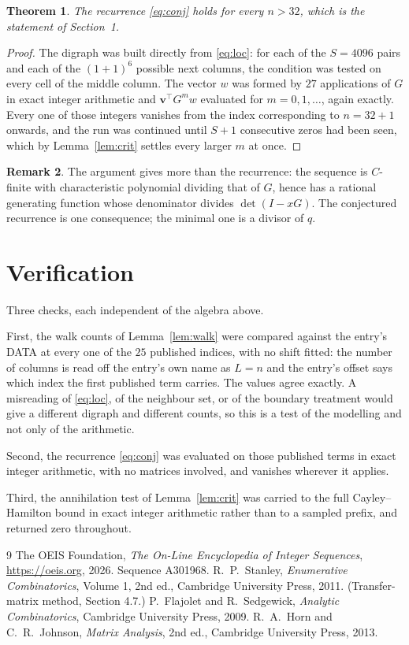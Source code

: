 \documentclass[11pt,a4paper]{article}
\theoremstyle{plain}
\newtheorem{theorem}{Theorem}
\theoremstyle{definition}
\newtheorem{remark}[theorem]{Remark}
\begin{document}
\begin{theorem}
The recurrence \eqref{eq:conj} holds for every $n>32$, which is the statement of
Section~1.
\end{theorem}

\begin{proof}
The digraph was built directly from \eqref{eq:loc}: for each of the $S=4096$ pairs and each
of the $(1+1)^{6}$ possible next columns, the condition was tested on every cell of
the middle column. The vector $w$ was formed by $27$ applications of $G$ in exact integer
arithmetic and $\mathbf{v}^{\!\top}G^{m}w$ evaluated for $m=0,1,\dots$, again exactly.
Every one of those integers vanishes from the index corresponding to $n=32+1$ onwards,
and the run was continued until $S+1$ consecutive zeros had been seen, which by
Lemma~\ref{lem:crit} settles every larger $m$ at once.
\end{proof}

\begin{remark}
The argument gives more than the recurrence: the sequence is $C$-finite with characteristic
polynomial dividing that of $G$, hence has a rational generating function whose denominator
divides $\det(I-xG)$. The conjectured recurrence is one consequence; the minimal one is a
divisor of $q$.
\end{remark}

\section{Verification}

Three checks, each independent of the algebra above.

First, the walk counts of Lemma~\ref{lem:walk} were compared against the entry's DATA at
every one of the $25$ published indices, with no shift fitted: the number of columns is
read off the entry's own name as $L=n$ and the entry's offset says which index the first
published term carries. The values agree exactly. A misreading of \eqref{eq:loc}, of the
neighbour set, or of the boundary treatment would give a different digraph and different
counts, so this is a test of the modelling and not only of the arithmetic.

Second, the recurrence \eqref{eq:conj} was evaluated on those published terms in exact
integer arithmetic, with no matrices involved, and vanishes wherever it applies.

Third, the annihilation test of Lemma~\ref{lem:crit} was carried to the full
Cayley--Hamilton bound in exact integer arithmetic rather than to a sampled prefix, and
returned zero throughout.

\begin{thebibliography}{9}
 The OEIS Foundation, \emph{The On-Line Encyclopedia of Integer
Sequences}, \url{https://oeis.org}, 2026. Sequence A301968.
 R.~P.~Stanley, \emph{Enumerative Combinatorics}, Volume 1, 2nd ed.,
Cambridge University Press, 2011. (Transfer-matrix method, Section 4.7.)
 P.~Flajolet and R.~Sedgewick, \emph{Analytic Combinatorics}, Cambridge
University Press, 2009.
 R.~A.~Horn and C.~R.~Johnson, \emph{Matrix Analysis}, 2nd ed., Cambridge
University Press, 2013.
\end{thebibliography}
\end{document}
